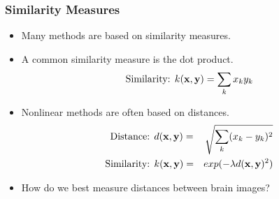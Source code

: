 \begin{frame}
\frametitle{Similarity Measures}
\begin{itemize}
\item Many methods are based on similarity measures.
\item A common similarity measure is the dot product.
\begin{eqnarray*}
\text{Similarity: } k({\bf x},{\bf y}) = \sum_k x_k y_k
\end{eqnarray*}
\item Nonlinear methods are often based on distances.
\begin{eqnarray*}
\text{Distance: } & d({\bf x},{\bf y}) = & \sqrt{\sum_k (x_k-y_k)^2}\cr
\text{Similarity: } & k({\bf x},{\bf y}) = & exp(-\lambda d({\bf x},{\bf y})^2)
\end{eqnarray*}
\item How do we best measure distances between brain images?
\end{itemize}
\end{frame}





